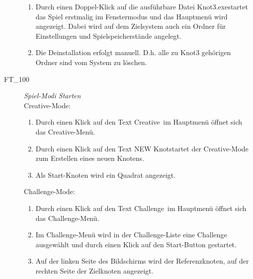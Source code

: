 \begin{description}
\begin{enumerate}
		\item Durch einen Doppel-Klick auf die ausführbare Datei \glqq Knot3.exe\grqq startet das Spiel erstmalig im Fenstermodus und das Hauptmenü wird angezeigt. Dabei wird auf dem Zielsystem auch ein Ordner für Einstellungen und Spielspeicherstände angelegt.
		
		\item Die Deinstallation erfolgt manuell. D.h. alle zu Knot3 gehörigen Ordner sind vom System zu löschen.
		~\\ 
	
	\end{enumerate}
	
	\item[FT\_100] \textit{Spiel-Modi Starten} \hfill\\
	
	Creative-Mode:\\
	
	\begin{enumerate}
	
		\item Durch einen Klick auf den Text \glqq Creative\grqq~im Hauptmenü öffnet sich das Creative-Menü.
		
		\item Durch einen Klick auf den Text \glqq NEW Knot\glqq startet der Creative-Mode zum Erstellen eines neuen Knotens.
		
		\item Als Start-Knoten wird ein Quadrat angezeigt.
	
	\end{enumerate}
	
	Challenge-Mode:\\
	
	\begin{enumerate}
	
		\item Durch einen Klick auf den Text \glqq Challenge\grqq~im Hauptmenü öffnet sich das Challenge-Menü.
		
		\item Im Challenge-Menü wird in der Challenge-Liste eine Challenge ausgewählt und durch einen Klick auf den Start-Button gestartet.
		
		\item Auf der linken Seite des Bildschirms wird der Referenzknoten, auf der rechten Seite der Zielknoten angezeigt.
	
	\end{enumerate}
	~\\

	
\end{description}









